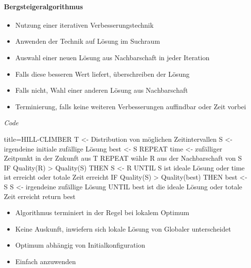 \documentclass[
    ngerman,
    color=3b,
    load_common, %
    summary,
    boxarc,
]{rubos-tuda-template}
\begin{document}
\paragraph{Bergsteigeralgorithmus}\mbox{}
\begin{idea}[Bergsteigeralgorithmus]\mbox{}
    \begin{itemize}
        \item Nutzung einer iterativen Verbesserungstechnik
        \item Anwenden der Technik auf  Lösung im Suchraum
        \item Auswahl einer neuen Lösung aus Nachbarschaft in jeder Iteration
        \item Falls diese besseren Wert liefert, überschreiben der  Lösung
        \item Falls nicht, Wahl einer anderen Lösung aus Nachbarschaft
        \item Terminierung, falls keine weiteren Verbesserungen auffindbar oder Zeit vorbei
    \end{itemize}
\end{idea}
\textit{Code}

\begin{codeBlock}[autogobble,fontsize=\small]{title={HILL-CLIMBER}}
    T <- Distribution von möglichen Zeitintervallen
    S <- irgendeine initiale zufällige Lösung
    best <- S
    REPEAT
        time <- zufälliger Zeitpunkt in der Zukunft aus T
        REPEAT
            wähle R aus der Nachbarschaft von S
            IF Quality(R) > Quality(S) THEN
                S <- R
        UNTIL S ist ideale Lösung oder time ist erreicht oder totale Zeit erreicht
        IF Quality(S) > Quality(best) THEN
            best <- S
        S <- irgendeine zufällige Lösung
    UNTIL best ist die ideale Lösung oder totale Zeit erreicht
    return best
\end{codeBlock}
\begin{description}[leftmargin=2cm,itemsep=1em]
    \item[Nachteile] \begin{itemize}
              \item Algorithmus terminiert in der Regel bei lokalem Optimum
              \item Keine Auskunft, inwiefern sich lokale Lösung von Globaler unterscheidet
              \item Optimum abhängig von Initialkonfiguration
          \end{itemize}
    \item[Vorteile] \begin{itemize}
              \item Einfach anzuwenden
          \end{itemize}
\end{description}
\end{document}
